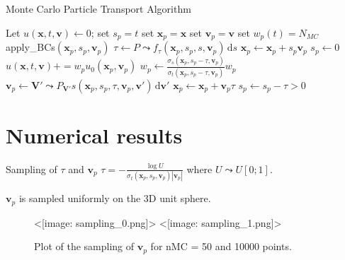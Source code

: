 \documentclass[aspectratio=1610]{beamer}
\newcommand{\bm}[1]{\symbf{#1}}
\newcommand{\di}{\ensuremath{\, \mathrm{d}}}
\def\texttt#1{<#1>}%
\begin{document}
\begin{frame}[fragile]{Monte Carlo Particle Transport Algorithm}
    \begin{multicols}{2}
        \begin{algorithmic}[1]
                \State Let $u(\bm{x}, t, \bm{v}) \gets 0$;
                    \State set $s_p = t$
                    \State set $\bm{x}_p = \bm{x}$
                    \State set $\bm{v}_p = \bm{v}$
                    \State set $w_p(t) = N_{MC}$
                        \If{$\bm{x}_p \not \in \mathcal{D}$}
                            \State apply\_BCs$(\bm{x}_p, s_p, \bm{v}_p)$
                        \EndIf
                        \State $\tau \gets P \leadsto f_\tau(\bm{x}_p, s_p, s, \bm{v}_p) \di s$
                        \newcolumn
                            \State $\bm{x}_p \gets \bm{x}_p + s_p \bm{v}_p$
                            \State $s_p \gets 0$
                            \State $u(\bm{x}, t, \bm{v}) += w_p u_0(\bm{x}_p, \bm{v}_p)$
                        \Else
                            \State $w_p \gets \frac{\sigma_s(\bm{x}_p, s_p - \tau, \bm{v}_p)}{\sigma_t(\bm{x}_p, s_p - \tau, \bm{v}_p)} w_p$
                            \State $\bm{v}_p \gets \bm{V}' \leadsto P_{\bm{V}'}s(\bm{x}_p, s_p, \tau, \bm{v}_p, \bm{v}') \di \bm{v}'$
                            \State $\bm{x}_p \gets \bm{x}_p + \bm{v}_p \tau$
                            \State $s_p \gets s_p - \tau > 0$
                        \EndIf
                    \EndWhile

                \EndFor
        \end{algorithmic}
    \end{multicols}
\end{frame}

\section{Numerical results}

\begin{frame}[fragile]{Sampling of $\tau$ and $\bm{v}_p$}
    $\tau = - \frac{\log U}{\sigma_t(\bm{x}_p, s_p, \bm{v}_p) |\bm{v}_p|}$ where $U \leadsto U[0;1]$.

    $\bm{v}_p$ is sampled uniformly on the 3D unit sphere.
    \vspace{-1em}
    \begin{figure}[h]
  \centering
  \begin{multicols}{2}
  \texttt{[image: sampling\_0.png]}
  \texttt{[image: sampling\_1.png]}
  \end{multicols}
  \label{fig:samplings}
  \caption{Plot of the sampling of $\bm{v}_p$ for nMC = 50 and 10000 points.}
\end{figure}
\end{frame}
\end{document}
